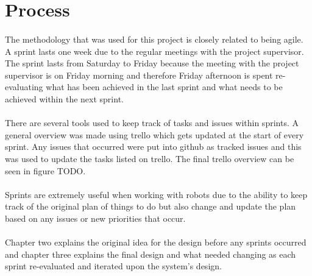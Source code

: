 \section{Process}
\paragraph{}
The methodology that was used for this project is closely related to being agile. A sprint\cite{SCRUM} lasts one week due to the regular meetings with the project supervisor. The sprint lasts from Saturday to Friday because the meeting with the project supervisor is on Friday morning and therefore Friday afternoon is spent re-evaluating what has been achieved in the last sprint and what needs to be achieved within the next sprint.
\paragraph{}
There are several tools used to keep track of tasks and issues within sprints. A general overview was made using trello\cite{TRELLO} which gets updated at the start of every sprint. Any issues that occurred were put into github as tracked issues and this was used to update the tasks listed on trello. The final trello overview can be seen in figure TODO.
\paragraph{}
Sprints are extremely useful when working with robots due to the ability to keep track of the original plan of things to do but also change and update the plan based on any issues or new priorities that occur.
\paragraph{}
Chapter two explains the original idea for the design before any sprints occurred and chapter three explains the final design and what needed changing as each sprint re-evaluated and iterated upon the system's design.
